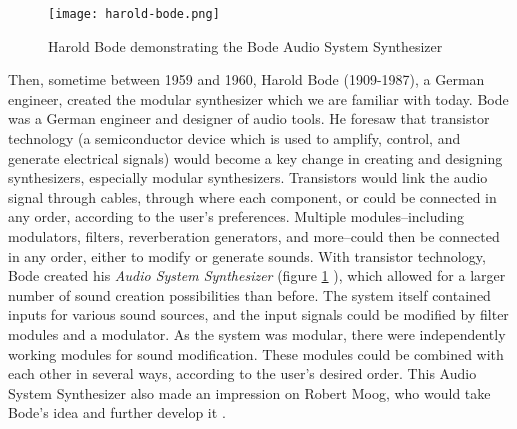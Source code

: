 \begin{figure}
  \centering
  \texttt{[image: harold-bode.png]}
  \caption{Harold Bode demonstrating the Bode Audio System Synthesizer}
  \label{fig:harold-bode}
\end{figure}


Then, sometime between 1959 and 1960, Harold Bode (1909-1987), a German engineer, created the modular synthesizer which we are familiar with today. Bode was a German engineer and designer of audio tools. He foresaw that transistor technology (a semiconductor device which is used to amplify, control, and generate electrical signals) would become a key change in creating and designing synthesizers, especially modular synthesizers\cite{Gabrielli_2020}. Transistors would link the audio signal through cables, through where each component, or  could be connected in any order, according to the user's preferences. Multiple modules--including modulators, filters, reverberation generators, and more--could then be connected in any order, either to modify or generate sounds. With transistor technology, Bode created his \textit{Audio System Synthesizer} (figure \ref{fig:harold-bode} \cite{Crab_2019_harold}), which allowed for a larger number of sound creation possibilities than before. The system itself contained inputs for various sound sources, and the input signals could be modified by filter modules and a modulator\cite{Bode_1984}. As the system was modular, there were independently working modules for sound modification. These modules could be combined with each other in several ways, according to the user's desired order. This Audio System Synthesizer also made an impression on Robert Moog, who would take Bode's idea and further develop it \cite{Gabrielli_2020}. 

